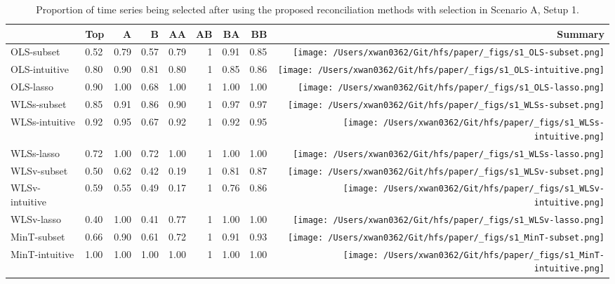 \documentclass[
  11pt]{article}
\begin{document}
\hypertarget{tbl-s1-selection}{}
\begin{table}
\caption{\label{tbl-s1-selection}Proportion of time series being selected after using the proposed
reconciliation methods with selection in Scenario A, Setup 1. }\tabularnewline

\centering\begingroup\fontsize{11}{13}\selectfont

\begin{threeparttable}
\begin{tabular}{llrrrrrr>{}r}
\toprule
  & Top & A & B & AA & AB & BA & BB & Summary\\
\midrule
OLS-subset & 0.52 & 0.79 & 0.57 & 0.79 & 1 & 0.91 & 0.85 & \texttt{[image: /Users/xwan0362/Git/hfs/paper/\_figs/s1\_OLS-subset.png]}\\
OLS-intuitive & 0.80 & 0.90 & 0.81 & 0.80 & 1 & 0.85 & 0.86 & \texttt{[image: /Users/xwan0362/Git/hfs/paper/\_figs/s1\_OLS-intuitive.png]}\\
OLS-lasso & 0.90 & 1.00 & 0.68 & 1.00 & 1 & 1.00 & 1.00 & \texttt{[image: /Users/xwan0362/Git/hfs/paper/\_figs/s1\_OLS-lasso.png]}\\
\midrule
WLSs-subset & 0.85 & 0.91 & 0.86 & 0.90 & 1 & 0.97 & 0.97 & \texttt{[image: /Users/xwan0362/Git/hfs/paper/\_figs/s1\_WLSs-subset.png]}\\
WLSs-intuitive & 0.92 & 0.95 & 0.67 & 0.92 & 1 & 0.92 & 0.95 & \texttt{[image: /Users/xwan0362/Git/hfs/paper/\_figs/s1\_WLSs-intuitive.png]}\\
WLSs-lasso & 0.72 & 1.00 & 0.72 & 1.00 & 1 & 1.00 & 1.00 & \texttt{[image: /Users/xwan0362/Git/hfs/paper/\_figs/s1\_WLSs-lasso.png]}\\
\midrule
WLSv-subset & 0.50 & 0.62 & 0.42 & 0.19 & 1 & 0.81 & 0.87 & \texttt{[image: /Users/xwan0362/Git/hfs/paper/\_figs/s1\_WLSv-subset.png]}\\
WLSv-intuitive & 0.59 & 0.55 & 0.49 & 0.17 & 1 & 0.76 & 0.86 & \texttt{[image: /Users/xwan0362/Git/hfs/paper/\_figs/s1\_WLSv-intuitive.png]}\\
WLSv-lasso & 0.40 & 1.00 & 0.41 & 0.77 & 1 & 1.00 & 1.00 & \texttt{[image: /Users/xwan0362/Git/hfs/paper/\_figs/s1\_WLSv-lasso.png]}\\
\midrule
MinT-subset & 0.66 & 0.90 & 0.61 & 0.72 & 1 & 0.91 & 0.93 & \texttt{[image: /Users/xwan0362/Git/hfs/paper/\_figs/s1\_MinT-subset.png]}\\
MinT-intuitive & 1.00 & 1.00 & 1.00 & 1.00 & 1 & 1.00 & 1.00 & \texttt{[image: /Users/xwan0362/Git/hfs/paper/\_figs/s1\_MinT-intuitive.png]}\\

\end{tabular}
\end{threeparttable}
\end{table}
\end{document}
